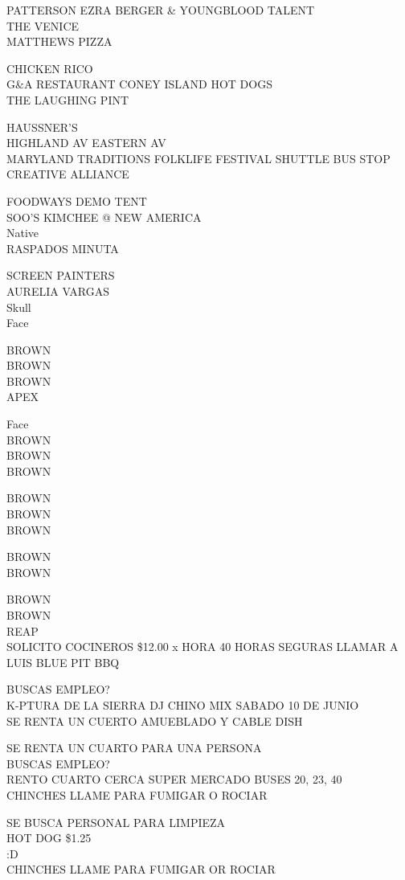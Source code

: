 \documentclass[10pt,letterpaper]{article}
\begin{document}
PATTERSON EZRA BERGER \& YOUNGBLOOD TALENT\\
THE VENICE\\
MATTHEWS PIZZA

CHICKEN RICO\\
G\&A RESTAURANT CONEY ISLAND HOT DOGS\\
THE LAUGHING PINT

HAUSSNER'S\\
HIGHLAND AV EASTERN AV\\
MARYLAND TRADITIONS FOLKLIFE FESTIVAL SHUTTLE BUS STOP CREATIVE ALLIANCE

FOODWAYS DEMO TENT\\
SOO'S KIMCHEE @ NEW AMERICA\\
Native\\
RASPADOS MINUTA

SCREEN PAINTERS\\
AURELIA VARGAS\\
Skull\\
Face

BROWN\\
BROWN\\
BROWN\\
APEX

Face\\
BROWN\\
BROWN\\
BROWN

BROWN\\
BROWN\\
BROWN

BROWN\\
BROWN

BROWN\\
BROWN\\
REAP\\
SOLICITO COCINEROS \$12.00 x HORA 40 HORAS SEGURAS LLAMAR A LUIS BLUE PIT BBQ

BUSCAS EMPLEO?\\
K{-}PTURA DE LA SIERRA DJ CHINO MIX SABADO 10 DE JUNIO\\
SE RENTA UN CUERTO AMUEBLADO Y CABLE DISH

SE RENTA UN CUARTO PARA UNA PERSONA\\
BUSCAS EMPLEO?\\
RENTO CUARTO CERCA SUPER MERCADO BUSES 20, 23, 40\\
CHINCHES LLAME PARA FUMIGAR O ROCIAR

SE BUSCA PERSONAL PARA LIMPIEZA\\
HOT DOG \$1.25\\
:D\\
CHINCHES LLAME PARA FUMIGAR OR ROCIAR
\end{document}

